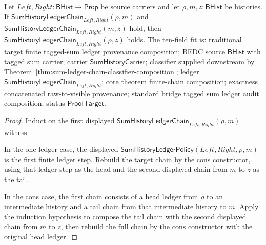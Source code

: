 \begin{theorem}
\label{thm:sum-ledger-chain-transitivity}
Let $Left,Right:\mathsf{BHist}\to\mathsf{Prop}$ be source carriers and let
$\rho,m,z:\mathsf{BHist}$ be histories. If
$\mathsf{SumHistoryLedgerChain}_{Left,Right}(\rho,m)$ and
$\mathsf{SumHistoryLedgerChain}_{Left,Right}(m,z)$ hold, then
$\mathsf{SumHistoryLedgerChain}_{Left,Right}(\rho,z)$ holds. The ten-field fit is:
traditional target finite tagged-sum ledger provenance composition; BEDC source
$\mathsf{BHist}$ with tagged sum carrier; carrier $\mathsf{SumHistoryCarrier}$;
classifier supplied downstream by
Theorem~\ref{thm:sum-ledger-chain-classifier-composition}; ledger
$\mathsf{SumHistoryLedgerChain}_{Left,Right}$; core theorem finite-chain
composition; exactness concatenated raw-to-visible provenance; standard bridge
tagged sum ledger audit composition; status $\mathsf{ProofTarget}$.
\end{theorem}
\begin{proof}
Induct on the first displayed
$\mathsf{SumHistoryLedgerChain}_{Left,Right}(\rho,m)$ witness.

In the one-ledger case, the displayed
$\mathsf{SumHistoryLedgerPolicy}(Left,Right,\rho,m)$ is the first finite ledger
step. Rebuild the target chain by the cons constructor, using that ledger step
as the head and the second displayed chain from $m$ to $z$ as the tail.

In the cons case, the first chain consists of a head ledger from $\rho$ to an
intermediate history and a tail chain from that intermediate history to $m$.
Apply the induction hypothesis to compose the tail chain with the second
displayed chain from $m$ to $z$, then rebuild the full chain by the cons
constructor with the original head ledger.
\end{proof}

